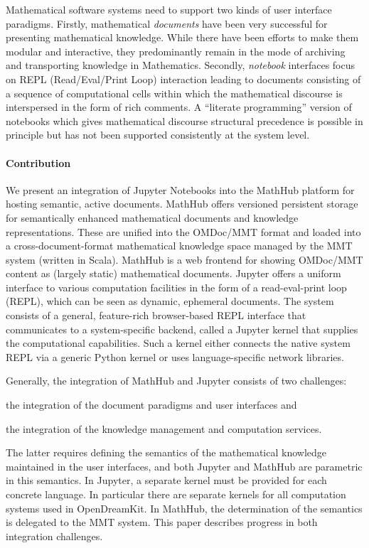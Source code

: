 Mathematical software systems need to support two kinds of user interface paradigms.
Firstly, mathematical \emph{documents} have been very successful for presenting mathematical knowledge.
While there have been efforts to make them modular and interactive, they predominantly remain in the mode of archiving and transporting knowledge in Mathematics.
Secondly, \emph{notebook} interfaces focus on REPL (Read/Eval/Print Loop) interaction leading to documents consisting of a sequence of computational cells within which the mathematical discourse is interspersed in the form of rich comments.
A ``literate programming'' version of notebooks which gives mathematical discourse structural precedence is possible in principle but has not been supported consistently at the system level.

\paragraph{Contribution}
We present an integration of Jupyter Notebooks into the MathHub platform for hosting semantic, active documents.
MathHub offers versioned persistent storage for semantically enhanced mathematical documents and knowledge representations.
These are unified into the OMDoc/MMT format and loaded into a cross-document-format mathematical knowledge space managed by the MMT system (written in Scala).  
MathHub is a web frontend for showing OMDoc/MMT content as (largely static) mathematical documents.
Jupyter offers a uniform interface to various computation facilities in the form of a read-eval-print loop (REPL), which can be seen as dynamic, ephemeral documents.
The system consists of a general, feature-rich browser-based REPL interface that communicates to a system-specific backend, called a Jupyter kernel that supplies the computational capabilities.
Such a kernel either connects the native system REPL via a generic Python kernel or uses language-specific network libraries. 

Generally, the integration of MathHub and Jupyter consists of two challenges:
\begin{compactenum}[\em i\rm )]
\item the integration of the document paradigms and user interfaces 
and
\item the integration of the knowledge management and computation services.
\end{compactenum}
The latter requires defining the semantics of the mathematical knowledge maintained in the user interfaces, and both Jupyter and MathHub are parametric in this semantics.
In Jupyter, a separate kernel must be provided for each concrete language.
In particular there are separate kernels for all computation systems used in OpenDreamKit.
In MathHub, the determination of the semantics is delegated to the MMT system. This paper describes progress in both integration challenges.

